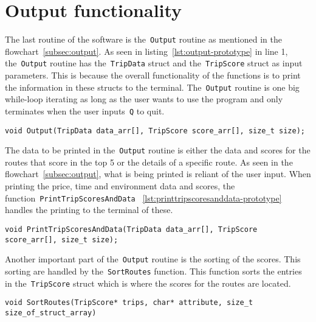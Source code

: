 \section{Output functionality}\label{sec:output-functionality}

The last routine of the software is the~\texttt{Output} routine as mentioned in the flowchart~\ref{subsec:output}.
As seen in listing~\ref{lst:output-prototype} in line 1, the~\texttt{Output} routine has the~\texttt{TripData} struct
and the~\texttt{TripScore} struct as input parameters.
This is because the overall functionality of the functions is to print the information in these structs to the terminal.
The~\texttt{Output} routine is one big while-loop iterating as long as the user wants to use the program and only
terminates when the user inputs~\texttt{Q} to quit.

\begin{lstlisting}[caption={Function prototype for~\texttt{Output}}, label={lst:output-prototype}]
void Output(TripData data_arr[], TripScore score_arr[], size_t size);
\end{lstlisting}

The data to be printed in the~\texttt{Output} routine is either the data and scores for the routes that score in the top
5 or the details of a specific route.
As seen in the flowchart~\ref{subsec:output}, what is being printed is reliant of the user input.
When printing the price, time and environment data and scores, the function~\texttt{PrintTripScoresAndData}
~\ref{lst:printtripscoresanddata-prototype} handles the printing to the terminal of these.

\begin{lstlisting}[caption={Function prototype for~\texttt{PrintTripScoresAndData}}, label={lst:printtripscoresanddata-prototype}]
void PrintTripScoresAndData(TripData data_arr[], TripScore score_arr[], size_t size);
\end{lstlisting}


Another important part of the~\texttt{Output} routine is the sorting of the scores.
This sorting are handled by the~\texttt{SortRoutes} function.
This function sorts the entries in the~\texttt{TripScore} struct which is where the scores for the routes are located.


\begin{lstlisting}[caption={Function prototype for~\texttt{SortRoutes}}, label={lst:sortroutes-prototype}]
void SortRoutes(TripScore* trips, char* attribute, size_t size_of_struct_array)
\end{lstlisting}
